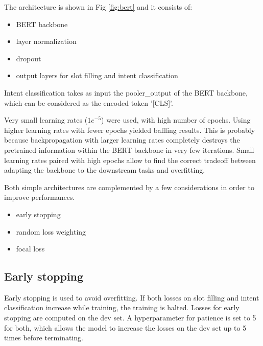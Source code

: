 \documentclass[a4paper]{article}
\begin{document}
The architecture is shown in Fig \ref{fig:bert} and it consists of:
\begin{itemize}
	\item BERT backbone
	\item layer normalization
	\item dropout
	\item output layers for slot filling and intent classification
\end{itemize}

Intent classification takes as input the pooler\_output of the BERT backbone, which can be considered as the encoded token '[CLS]'.

Very small learning rates ($1e^{-5}$) were used, with high number of epochs. Using higher learning rates with fewer epochs yielded baffling results. This is probably because backpropagation with larger learning rates completely destroys the pretrained information within the BERT backbone in very few iterations. Small learning rates paired with high epochs allow to find the correct tradeoff between adapting the backbone to the downstream tasks and overfitting.


Both simple architectures are complemented by a few considerations in order to improve performances.

\begin{itemize}
	\item early stopping
	\item random loss weighting
	\item focal loss
\end{itemize}

\subsection{Early stopping}

Early stopping is used to avoid overfitting. If both losses on slot filling and intent classification increase while training, the training is halted. Losses for early stopping are computed on the dev set. A hyperparameter for patience is set to 5 for both, which allows the model to increase the losses on the dev set up to 5 times before terminating.


%	
\end{document}

